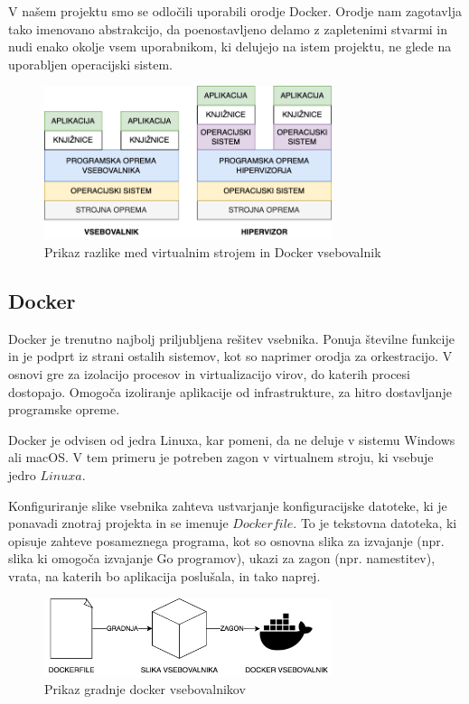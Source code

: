 \documentclass[a4paper, 12pt]{book}
\begin{document}
V našem projektu smo se odločili uporabili orodje Docker. Orodje nam zagotavlja tako imenovano abstrakcijo, da poenostavljeno delamo z zapletenimi stvarmi in nudi enako okolje vsem uporabnikom, ki delujejo na istem projektu, ne glede na uporabljen operacijski sistem. 

\begin{figure}[h]
\begin{center}
\includegraphics[width=0.75\textwidth]{slike/docker-vs-vm.png}
\end{center}
\caption{ Prikaz razlike med virtualnim strojem in Docker vsebovalnik }
\label{docker-vs-vm}
\end{figure}

\subsection{Docker}
Docker je trenutno najbolj priljubljena rešitev vsebnika. Ponuja številne funkcije in je podprt iz strani ostalih sistemov, kot so naprimer orodja za orkestracijo. V osnovi gre za izolacijo procesov in virtualizacijo virov, do katerih procesi dostopajo. Omogoča izoliranje aplikacije od infrastrukture, za hitro dostavljanje programske opreme. \cite{linuxcontainers} 

Docker je odvisen od jedra Linuxa, kar pomeni, da ne deluje v sistemu Windows ali macOS. V tem primeru je potreben zagon v virtualnem stroju, ki vsebuje jedro $Linuxa$. \cite{docker-in-action}

Konfiguriranje slike vsebnika zahteva ustvarjanje konfiguracijske datoteke, ki je ponavadi znotraj projekta in se imenuje $Dockerfile$. To je tekstovna datoteka, ki opisuje zahteve posameznega programa, kot so osnovna slika za izvajanje (npr. slika ki omogoča izvajanje Go programov), ukazi za zagon (npr. namestitev), vrata, na katerih bo aplikacija poslušala, in tako naprej.

\begin{figure}[h]
\begin{center}
\includegraphics[width=0.75\textwidth]{slike/docker-flow.png}
\end{center}
\caption{ Prikaz gradnje docker vsebovalnikov }
\label{password-reset-form}
\end{figure}
\end{document}
